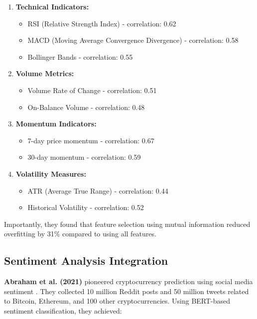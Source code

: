 \documentclass[conference]{IEEEtran}
\begin{document}
\begin{enumerate}
    \item \textbf{Technical Indicators:}
    \begin{itemize}
        \item RSI (Relative Strength Index) - correlation: 0.62
        \item MACD (Moving Average Convergence Divergence) - correlation: 0.58
        \item Bollinger Bands - correlation: 0.55
    \end{itemize}
    
    \item \textbf{Volume Metrics:}
    \begin{itemize}
        \item Volume Rate of Change - correlation: 0.51
        \item On-Balance Volume - correlation: 0.48
    \end{itemize}
    
    \item \textbf{Momentum Indicators:}
    \begin{itemize}
        \item 7-day price momentum - correlation: 0.67
        \item 30-day momentum - correlation: 0.59
    \end{itemize}
    
    \item \textbf{Volatility Measures:}
    \begin{itemize}
        \item ATR (Average True Range) - correlation: 0.44
        \item Historical Volatility - correlation: 0.52
    \end{itemize}
\end{enumerate}

Importantly, they found that feature selection using mutual information reduced overfitting by 31\% compared to using all features.

\subsection{Sentiment Analysis Integration}

\textbf{Abraham et al. (2021)} pioneered cryptocurrency prediction using social media sentiment \cite{abraham2021sentiment}. They collected 10 million Reddit posts and 50 million tweets related to Bitcoin, Ethereum, and 100 other cryptocurrencies. Using BERT-based sentiment classification, they achieved:
\end{document}
